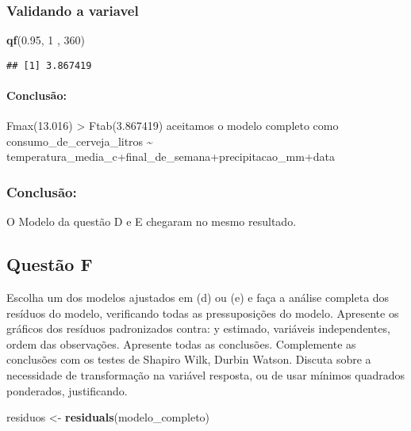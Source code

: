 \documentclass[
]{article}
\newenvironment{Shaded}{\begin{snugshade}}{\end{snugshade}}
\newcommand{\DecValTok}[1]{\textcolor[rgb]{0.00,0.00,0.81}{#1}}
\newcommand{\FloatTok}[1]{\textcolor[rgb]{0.00,0.00,0.81}{#1}}
\newcommand{\FunctionTok}[1]{\textcolor[rgb]{0.13,0.29,0.53}{\textbf{#1}}}
\newcommand{\NormalTok}[1]{#1}
\newcommand{\OtherTok}[1]{\textcolor[rgb]{0.56,0.35,0.01}{#1}}
\begin{document}
\hypertarget{validando-a-variavel-2}{%
\subsubsection{Validando a variavel}\label{validando-a-variavel-2}}

\begin{Shaded}
\begin{Highlighting}[]
\FunctionTok{qf}\NormalTok{(}\FloatTok{0.95}\NormalTok{, }\DecValTok{1}\NormalTok{ , }\DecValTok{360}\NormalTok{)}
\end{Highlighting}
\end{Shaded}

\begin{verbatim}
## [1] 3.867419
\end{verbatim}

\hypertarget{conclusuxe3o-8}{%
\paragraph{Conclusão:}\label{conclusuxe3o-8}}

Fmax(13.016) \textgreater{} Ftab(3.867419) aceitamos o modelo completo
como consumo\_de\_cerveja\_litros \textasciitilde{}
temperatura\_media\_c+final\_de\_semana+precipitacao\_mm+data

\hypertarget{conclusuxe3o-9}{%
\subsubsection{Conclusão:}\label{conclusuxe3o-9}}

O Modelo da questão D e E chegaram no mesmo resultado.

\hypertarget{questuxe3o-f}{%
\subsection{Questão F}\label{questuxe3o-f}}

Escolha um dos modelos ajustados em (d) ou (e) e faça a análise completa
dos resíduos do modelo, verificando todas as pressuposições do modelo.
Apresente os gráficos dos resíduos padronizados contra: y estimado,
variáveis independentes, ordem das observações. Apresente todas as
conclusões. Complemente as conclusões com os testes de Shapiro Wilk,
Durbin Watson. Discuta sobre a necessidade de transformação na variável
resposta, ou de usar mínimos quadrados ponderados, justificando.

\begin{Shaded}
\begin{Highlighting}[]
\NormalTok{residuos }\OtherTok{\textless{}{-}} \FunctionTok{residuals}\NormalTok{(modelo\_completo)}
\end{Highlighting}
\end{Shaded}
\end{document}
